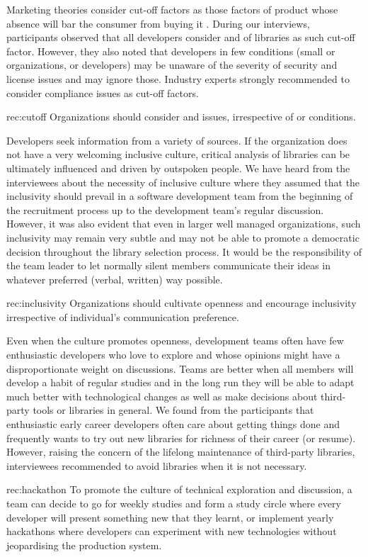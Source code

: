Marketing theories consider cut-off factors as those factors of product whose absence will bar the consumer from buying it \cite{blackwell2001consumer}. During our interviews, participants observed that all developers consider  and  of libraries as such cut-off factor. However, they also noted that developers in few conditions (small or  organizations, or  developers) may be unaware of the severity of security and license issues and may ignore those. Industry experts strongly recommended to consider compliance issues as cut-off factors.
 \begin{recommendation}{rec:cutoff}
Organizations should consider  and  issues, irrespective of  or  conditions.
\end{recommendation}\medskip


Developers seek information from a variety of sources. If the organization does not have a very welcoming inclusive culture, critical analysis of libraries can be ultimately influenced and driven by outspoken people. We have heard from the interviewees about the necessity of inclusive culture where they assumed that the inclusivity should prevail in a software development team from the beginning of the recruitment process up to the development team's regular discussion. However, it was also evident that even in larger well managed organizations, such inclusivity may remain very subtle and may not be able to promote a democratic decision throughout the library selection process. It would be the responsibility of the team leader to let normally silent members communicate their ideas in whatever preferred (verbal, written) way possible.
 \begin{recommendation}{rec:inclusivity}
Organizations should cultivate openness and encourage inclusivity irrespective of individual's communication preference. 
\end{recommendation}\medskip

 Even when the culture promotes openness, development teams often have few enthusiastic developers who love to explore and whose opinions might have a disproportionate weight on discussions. Teams are better when all members will develop a habit of regular studies and in the long run they will be able to adapt much better with technological changes as well as make decisions about third-party tools or libraries in general. We found from the participants that enthusiastic early career developers often care about getting things done and frequently wants to try out new libraries for richness of their career (or resume). However, raising the concern of the lifelong maintenance of third-party libraries, interviewees recommended to avoid libraries when it is not necessary. 
  \begin{recommendation}{rec:hackathon}
To promote the culture of technical exploration and discussion, a team can decide to go for weekly studies and form a study circle where every developer will present something new that they learnt, or implement yearly hackathons where developers can experiment with new technologies without jeopardising the production system. 
\end{recommendation}


